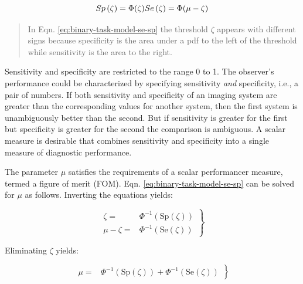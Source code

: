\documentclass[
]{book}
\begin{document}
\begin{equation} 
Sp\left ( \zeta \right ) = \Phi(\zeta)\\
Se\left ( \zeta \right ) = \Phi(\mu-\zeta)
\label{eq:binary-task-model-se-sp}
\end{equation}

\begin{quote}
In Eqn. \eqref{eq:binary-task-model-se-sp} the threshold \(\zeta\) appears with different signs because specificity is the area under a pdf to the left of the threshold while sensitivity is the area to the right.
\end{quote}

Sensitivity and specificity are restricted to the range 0 to 1. The observer's performance could be characterized by specifying sensitivity \emph{and} specificity, i.e., a pair of numbers. If both sensitivity and specificity of an imaging system are greater than the corresponding values for another system, then the first system is unambiguously better than the second. But if sensitivity is greater for the first but specificity is greater for the second the comparison is ambiguous. A scalar measure is desirable that combines sensitivity and specificity into a single measure of diagnostic performance.

The parameter \(\mu\) satisfies the requirements of a scalar performancer measure, termed a figure of merit (FOM). Eqn. \eqref{eq:binary-task-model-se-sp} can be solved for \(\mu\) as follows. Inverting the equations yields:

\begin{equation} 
\left.
\begin{aligned}  
\zeta =&\Phi^{-1} \left (\text{Sp}\left ( \zeta \right )  \right )\\
\mu - \zeta =& \Phi^{-1} \left (\text{Se}\left ( \zeta \right )  \right )
\end{aligned}
\right \}
\label{eq:binary-task-model-solve-mu-zeta}
\end{equation}

Eliminating \(\zeta\) yields:

\begin{equation} 
\left.
\begin{aligned}  
\mu =& \Phi^{-1} \left (\text{Sp}\left ( \zeta \right )  \right ) + \Phi^{-1} \left (\text{Se}\left ( \zeta \right )  \right )
\end{aligned}
\right \}
\label{eq:binary-task-model-solve-mu}
\end{equation}
\end{document}
